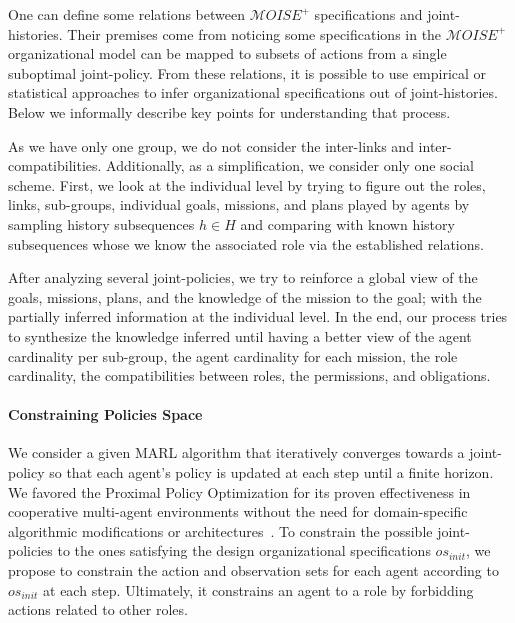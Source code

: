 \documentclass[runningheads]{llncs}
\newcounter{relation}
\begin{document}
One can define some relations between $\mathcal{M}OISE^+$ specifications and joint-histories. Their premises come from noticing some specifications in the $\mathcal{M}OISE^+$ organizational model can be mapped to subsets of actions from a single suboptimal joint-policy.
From these relations, it is possible to use empirical or statistical approaches to infer organizational specifications out of joint-histories. Below we informally describe key points for understanding that process.

As we have only one group, we do not consider the inter-links and inter-compatibilities. Additionally, as a simplification, we consider only one social scheme.
First, we look at the individual level by trying to figure out the roles, links, sub-groups, individual goals, missions, and plans played by agents by sampling history subsequences $h \in H$ and comparing with known history subsequences whose we know the associated role via the established relations.

After analyzing several joint-policies, we try to reinforce a global view of the goals, missions, plans, and the knowledge of the mission to the goal; with the partially inferred information at the individual level.
In the end, our process tries to synthesize the knowledge inferred until having a better view of the agent cardinality per sub-group, the agent cardinality for each mission, the role cardinality, the compatibilities between roles, the permissions, and obligations.

\paragraph{\textbf{Constraining Policies Space}}

We consider a given MARL algorithm that iteratively converges towards a joint-policy so that each agent's policy is updated at each step until a finite horizon.
We favored the Proximal Policy Optimization for its proven effectiveness in cooperative multi-agent environments without the need for domain-specific algorithmic modifications or architectures~\cite{Yu2022}.
To constrain the possible joint-policies to the ones satisfying the design organizational specifications $os_{init}$, we propose to constrain the action and observation sets for each agent according to $os_{init}$ at each step. Ultimately, it constrains an agent to a role by forbidding actions related to other roles.
\end{document}
